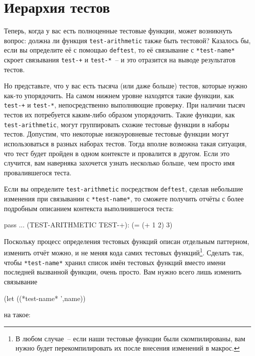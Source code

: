 \section{Иерархия тестов}

Теперь, когда у вас есть полноценные тестовые функции, может возникнуть вопрос: должна
ли функция \lstinline{test-arithmetic} также быть тестовой? Казалось бы, если вы определите
её с помощью \lstinline{deftest}, то её связывание с \lstinline{*test-name*} скроет связывания
\lstinline{test-+} и \lstinline{test-*}~-- и это отразится на выводе результатов тестов.

Но представьте, что у вас есть тысяча (или даже больше) тестов, которые нужно как-то
упорядочить. На самом нижнем уровне находятся такие функции, как \lstinline{test-+} и
\lstinline{test-*}, непосредственно выполняющие проверку. При наличии тысяч тестов их
потребуется каким-либо образом упорядочить. Такие функции, как \lstinline{test-arithmetic}, могут
группировать схожие тестовые функции в наборы тестов. Допустим, что некоторые
низкоуровневые тестовые функции могут использоваться в разных наборах тестов. Тогда вполне
возможна такая ситуация, что тест будет пройден в одном контексте и провалится в
другом. Если это случится, вам наверняка захочется узнать несколько больше, чем просто имя
провалившегося теста.

Если вы определите \lstinline{test-arithmetic} посредством \lstinline{deftest}, сделав небольшие
изменения при связывании с \lstinline{*test-name*}, то сможете получить отчёты с более
подробным описанием контекста выполнившегося теста:

\begin{myverb}
pass ... (TEST-ARITHMETIC TEST-+): (= (+ 1 2) 3)
\end{myverb}

Поскольку процесс определения тестовых функций описан отдельным паттерном, изменить отчёт
можно, и не меняя кода самих тестовых функций\footnote{В любом случае~-- если наши
  тестовые функции были скомпилированы, вам нужно будет перекомпилировать их после
  внесения изменений в макрос.}. Сделать так, чтобы \lstinline{*test-name*} хранил список имён
тестовых функций вместо имени последней вызванной функции, очень просто. Вам нужно всего
лишь изменить связывание

\begin{myverb}
(let ((*test-name* ',name))
\end{myverb}

\noindent{}на такое:

